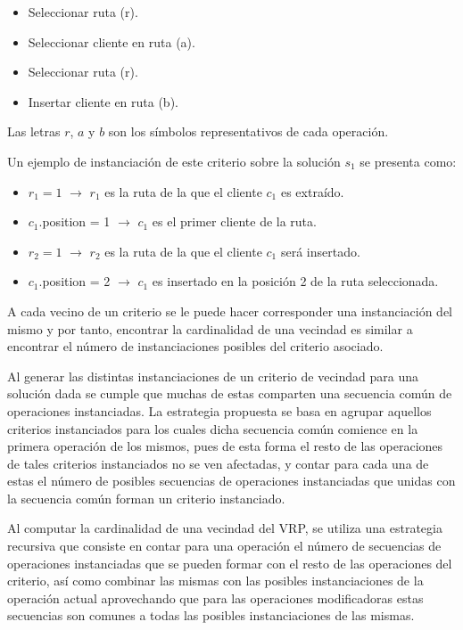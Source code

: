 \begin{itemize}
	\item Seleccionar ruta (r).
	\item Seleccionar cliente en ruta (a).
	\item Seleccionar ruta (r).
	\item Insertar cliente en ruta (b).
\end{itemize}
Las letras $r$, $a$ y $b$ son los símbolos representativos de cada operación.

Un ejemplo de instanciación de este criterio sobre la solución $s_1$ se presenta como:

\begin{itemize}
	\item $r_1 = 1$ $\rightarrow$ $r_1$ es la ruta de la que el cliente $c_1$ es extraído.
	\item $c_1$.position = 1 $\rightarrow$ $c_1$ es el primer cliente de la ruta.
	\item $r_2 = 1$ $\rightarrow$ $r_2$ es la ruta de la que el cliente $c_1$ será insertado.
	\item $c_1$.position = 2 $\rightarrow$ $c_1$ es insertado en la posición 2 de la ruta seleccionada.
\end{itemize}

A cada vecino de un criterio se le puede hacer corresponder una instanciación del mismo y por tanto, encontrar la cardinalidad de una vecindad es similar a encontrar el número de instanciaciones posibles del criterio asociado.

Al generar las distintas instanciaciones de un criterio de vecindad para
una solución dada se cumple que muchas de estas comparten una secuencia común de operaciones instanciadas. La estrategia propuesta se basa en
agrupar aquellos criterios instanciados para los cuales dicha secuencia común comience en la primera operación de los mismos, pues de esta forma
el resto de las operaciones de tales criterios instanciados no se ven afectadas, y contar para cada una de estas el número de posibles secuencias de operaciones instanciadas que unidas con la secuencia común forman un
criterio instanciado.

Al computar la cardinalidad de una vecindad del VRP, se utiliza una
estrategia recursiva que consiste en contar para una operación el número
de secuencias de operaciones instanciadas que se pueden formar con el
resto de las operaciones del criterio, así como combinar las mismas con
las posibles instanciaciones de la operación actual aprovechando que para
las operaciones modificadoras estas secuencias son comunes a todas las
posibles instanciaciones de las mismas.


